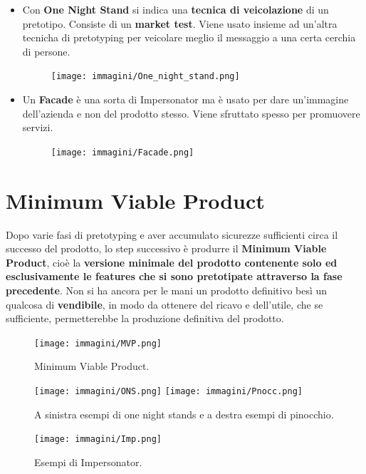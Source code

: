 \begin{itemize}
	\item Con \textbf{One Night Stand} si indica una \textbf{tecnica di veicolazione} di un pretotipo. Consiste di un \textbf{market test}.
	Viene usato insieme ad un'altra tecnicha di pretotyping per veicolare meglio il messaggio a una certa cerchia di persone.
	\begin{figure}[!h]
		\centering
		\texttt{[image: immagini/One\_night\_stand.png]}
	\end{figure}

	\item Un \textbf{Facade} è una sorta di Impersonator ma è usato per dare un'immagine dell'azienda e non del prodotto stesso. Viene sfruttato spesso
	per promuovere servizi.
	\begin{figure}[!h]
		\centering
		\texttt{[image: immagini/Facade.png]}
	\end{figure}

\end{itemize}

\pagebreak

\section{Minimum Viable Product}

Dopo varie fasi di pretotyping e aver accumulato sicurezze sufficienti circa il successo del prodotto, lo step successivo è produrre il
\textbf{Minimum Viable Product}, cioè la \textbf{versione minimale del prodotto contenente solo ed esclusivamente le features che si sono pretotipate
attraverso la fase precedente}. Non si ha ancora per le mani un prodotto definitivo besì un qualcosa di \textbf{vendibile}, in modo da ottenere del ricavo
e dell'utile, che se sufficiente, permetterebbe la produzione definitiva del prodotto.

\begin{figure}[!h]
	\centering
	\texttt{[image: immagini/MVP.png]}
	\caption{Minimum Viable Product.}
	\texttt{[image: immagini/ONS.png]}
	\texttt{[image: immagini/Pnocc.png]}
	\caption{A sinistra esempi di one night stands e a destra esempi di pinocchio.}
	\texttt{[image: immagini/Imp.png]}
	\caption{Esempi di Impersonator.}
\end{figure}

\pagebreak

